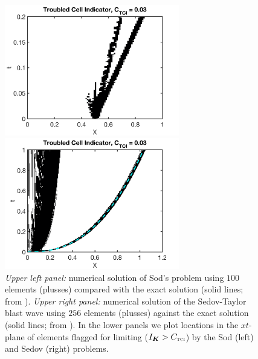 \documentclass[letterpaper]{jpconf}
\newcommand{\vect}[1]{\boldsymbol{#1}}
\newcommand{\bK}{\vect{K}}
\newcommand{\TCI}{\textnormal{\tiny\textsc{TCI}}}
\begin{document}
\begin{figure}[h]
\begin{minipage}{18pc}
    \includegraphics[width=18pc]{./Figures/Sod_TCI_Astronum_2018}
  \end{minipage}\hspace{0.5pc}%
  \begin{minipage}{18pc}
    \includegraphics[width=18pc]{./Figures/Sedov_TCI_Astronum_2018}
  \end{minipage}
  \caption{\label{fig:SodSedov}{\it Upper left panel:} numerical solution of Sod's problem using $100$ elements (plusses) compared with the exact solution (solid lines; from \cite{toro_1999}).  {\it Upper right panel:} numerical solution of the Sedov-Taylor blast wave using $256$ elements (plusses) against the exact solution (solid lines; from \cite{kammTimmes_2007}).  In the lower panels we plot locations in the $xt$-plane of elements flagged for limiting ($I_{\bK}>C_{\TCI}$) by the Sod (left) and Sedov (right) problems.}
\end{figure}
\end{document}
